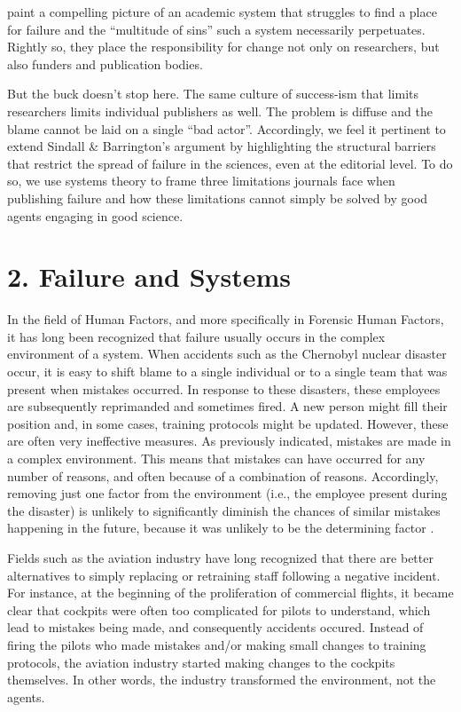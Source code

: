 \documentclass{article}
\begin{document}
\parencite{Sindall2020} paint a compelling picture of an academic system that struggles to find a place for failure and the “multitude of sins” such a system necessarily perpetuates. Rightly so, they place the responsibility for change not only on researchers, but also funders and publication bodies. 

But the buck doesn't stop here. The same culture of success-ism that limits researchers limits individual publishers as well. The problem is diffuse and the blame cannot be laid on a single “bad actor”. Accordingly, we feel it pertinent to extend Sindall \& Barrington's argument by highlighting the structural barriers that restrict the spread of failure in the sciences, even at the editorial level. To do so, we use systems theory to frame three limitations journals face when publishing failure and how these limitations cannot simply be solved by good agents engaging in good science. 



\section{2. Failure and Systems }

In the field of Human Factors, and more specifically in Forensic Human Factors, it has long been recognized that failure usually occurs in the complex environment of a system. When accidents such as the Chernobyl nuclear disaster occur, it is easy to shift blame to a single individual or to a single team that was present when mistakes occurred. In response to these disasters, these employees are subsequently reprimanded and sometimes fired. A new person might fill their position and, in some cases, training protocols might be updated. However, these are often very ineffective measures. As previously indicated, mistakes are made in a complex environment. This means that mistakes can have occurred for any number of reasons, and often because of a combination of reasons. Accordingly, removing just one factor from the environment (i.e., the employee present during the disaster) is unlikely to significantly diminish the chances of similar mistakes happening in the future, because it was unlikely to be the determining factor \parencite{Holden2009}. 

Fields such as the aviation industry have long recognized that there are better alternatives to simply replacing or retraining staff following a negative incident. For instance, at the beginning of the proliferation of commercial flights, it became clear that cockpits were often too complicated for pilots to understand, which lead to mistakes being made, and consequently accidents occured. Instead of firing the pilots who made mistakes and/or making small changes to training protocols, the aviation industry started making changes to the cockpits themselves. In other words, the industry transformed the environment, not the agents.
\end{document}
